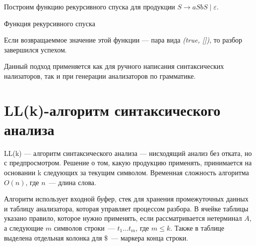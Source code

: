 \begin{example}

Построим функцию рекурсивного спуска для продукции $S \rightarrow aSbS \mid \varepsilon$.

\begin{algorithm}
\begin{algorithmic}[1]
\caption{Функция рекурсивного спуска}
    \EndIf

         \Else
        \EndIf
    \Else
    \EndIf
\EndFunction

\end{algorithmic}
\end{algorithm}
\end{example}

Если возвращаеммое значение этой функции  --- пара вида \textit{(true, [])}, то разбор завершился успехом.

Данный подход применяется как для ручного написания синтаксических нализаторов, так и при генерации анализаторов по грамматике.

\section{LL(k)-алгоритм синтаксического анализа}

LL(k) --- алгоритм синтаксического анализа --- нисходящий анализ без отката, но с предпросмотром.
Решение о том, какую продукцию применять, принимается на основании k следующих за текущим символом.
Временная сложность алгоритма $O(n)$, где $n$~--- длина слова.

Алгоритм использует входной буфер, стек для хранения промежуточных данных и таблицу анализатора, которая управляет процессом разбора.
В ячейке таблицы указано правило, которое нужно применять, если рассматривается нетерминал $A$, а следующие $m$ символов строки~--- $t_{1} \dots t_{m}$, где $m \leq k$.
Также в таблице выделена отдельная колонка для $\$$~--- маркера конца строки.

